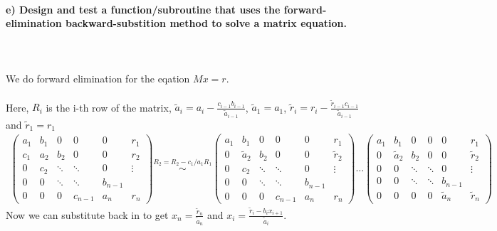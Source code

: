 \newpage
\paragraph{
    e) Design and test a function/subroutine that uses the
    forward-elimination backward-substition method to solve a matrix
    equation.
} \ \\
    \\
    We do forward elimination for the eqation $Mx = r$. \\
    \\
    Here, $R_i$ is the i-th row of the matrix, 
    $\tilde{a}_i = a_i - \frac{c_{i-1} b_{i-1}}{\tilde{a}_{i-1}}$, 
    $\tilde{a}_1 = a_1$, 
    $\tilde{r}_i = r_i - \frac{\tilde{r}_{i-1} c_{i-1}}{\tilde{a}_{i-1}}$ and 
    $\tilde{r}_1 = r_1$ \\
    \begin{align}
	\begin{pmatrix}
	a_1 & b_1 & 0      & 0       & 0   & r_1\\
	c_1 & a_2 & b_2    & 0       & 0 & r_2\\
	0   & c_2 & \ddots & \ddots  & 0 & \vdots\\
	0   & 0   & \ddots & \ddots  & b_{n-1} &\\
	0   & 0   & 0      & c_{n-1} & a_n& r_n
	\end{pmatrix}
	\overset{R_2 = R_2 - c_1/a_1 R_1}{\sim}
	\begin{pmatrix}
	a_1 & b_1 & 0      & 0       & 0   & r_1\\
	0 & \tilde{a}_2 & b_2    & 0       & 0 & \tilde{r}_2\\
	0   & c_2 & \ddots & \ddots  & 0 & \vdots\\
	0   & 0   & \ddots & \ddots  & b_{n-1} &\\
	0   & 0   & 0      & c_{n-1} & a_n& r_n
	\end{pmatrix}
	\dots
	\begin{pmatrix}
	a_1 & b_1 & 0      & 0       & 0   & r_1\\
	0 & \tilde{a}_2 & b_2    & 0       & 0 & \tilde{r}_2\\
	0   & 0 & \ddots & \ddots  & 0 & \vdots\\
	0   & 0   & \ddots & \ddots  & b_{n-1} &\\
	0   & 0   & 0      & 0 & \tilde{a}_n& \tilde{r}_n
	\end{pmatrix}
    \end{align}
    Now we can substitute back in to get 
    $x_n = \frac{\tilde{r}_n}{\tilde{a}_n} $ and 
    $x_i = \frac{\tilde{r}_{i} - b_{i} x_{i+1}}{\tilde{a}_{i}}$.

